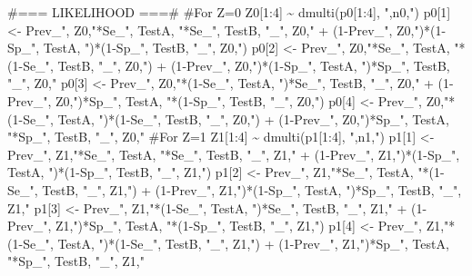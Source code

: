 \documentclass[
]{book}
\newenvironment{Shaded}{\begin{snugshade}}{\end{snugshade}}
\newcommand{\NormalTok}[1]{#1}
\newcommand{\StringTok}[1]{\textcolor[rgb]{0.31,0.60,0.02}{#1}}
\begin{document}
\begin{Shaded}
\begin{Highlighting}[]
\StringTok{\#=== LIKELIHOOD ===\#}
\StringTok{  \#For Z=0}
\StringTok{  Z0[1:4] \textasciitilde{} dmulti(p0[1:4], "}\NormalTok{,n0,}\StringTok{")}
\StringTok{  p0[1] \textless{}{-} Prev\_"}\NormalTok{, Z0,}\StringTok{"*Se\_"}\NormalTok{, TestA, }\StringTok{"*Se\_"}\NormalTok{, TestB, }\StringTok{"\_"}\NormalTok{, Z0,}\StringTok{" + (1{-}Prev\_"}\NormalTok{, Z0,}\StringTok{")*(1{-}Sp\_"}\NormalTok{, TestA, }\StringTok{")*(1{-}Sp\_"}\NormalTok{, TestB, }\StringTok{"\_"}\NormalTok{, Z0,}\StringTok{")}
\StringTok{  p0[2] \textless{}{-} Prev\_"}\NormalTok{, Z0,}\StringTok{"*Se\_"}\NormalTok{, TestA, }\StringTok{"*(1{-}Se\_"}\NormalTok{, TestB, }\StringTok{"\_"}\NormalTok{, Z0,}\StringTok{") + (1{-}Prev\_"}\NormalTok{, Z0,}\StringTok{")*(1{-}Sp\_"}\NormalTok{, TestA, }\StringTok{")*Sp\_"}\NormalTok{, TestB, }\StringTok{"\_"}\NormalTok{, Z0,}\StringTok{"}
\StringTok{  p0[3] \textless{}{-} Prev\_"}\NormalTok{, Z0,}\StringTok{"*(1{-}Se\_"}\NormalTok{, TestA, }\StringTok{")*Se\_"}\NormalTok{, TestB, }\StringTok{"\_"}\NormalTok{, Z0,}\StringTok{" + (1{-}Prev\_"}\NormalTok{, Z0,}\StringTok{")*Sp\_"}\NormalTok{, TestA, }\StringTok{"*(1{-}Sp\_"}\NormalTok{, TestB, }\StringTok{"\_"}\NormalTok{, Z0,}\StringTok{")}
\StringTok{  p0[4] \textless{}{-} Prev\_"}\NormalTok{, Z0,}\StringTok{"*(1{-}Se\_"}\NormalTok{, TestA, }\StringTok{")*(1{-}Se\_"}\NormalTok{, TestB, }\StringTok{"\_"}\NormalTok{, Z0,}\StringTok{") + (1{-}Prev\_"}\NormalTok{, Z0,}\StringTok{")*Sp\_"}\NormalTok{, TestA, }\StringTok{"*Sp\_"}\NormalTok{, TestB, }\StringTok{"\_"}\NormalTok{, Z0,}\StringTok{"}
\StringTok{  }
\StringTok{  \#For Z=1}
\StringTok{  Z1[1:4] \textasciitilde{} dmulti(p1[1:4], "}\NormalTok{,n1,}\StringTok{")}
\StringTok{  p1[1] \textless{}{-} Prev\_"}\NormalTok{, Z1,}\StringTok{"*Se\_"}\NormalTok{, TestA, }\StringTok{"*Se\_"}\NormalTok{, TestB, }\StringTok{"\_"}\NormalTok{, Z1,}\StringTok{" + (1{-}Prev\_"}\NormalTok{, Z1,}\StringTok{")*(1{-}Sp\_"}\NormalTok{, TestA, }\StringTok{")*(1{-}Sp\_"}\NormalTok{, TestB, }\StringTok{"\_"}\NormalTok{, Z1,}\StringTok{")}
\StringTok{  p1[2] \textless{}{-} Prev\_"}\NormalTok{, Z1,}\StringTok{"*Se\_"}\NormalTok{, TestA, }\StringTok{"*(1{-}Se\_"}\NormalTok{, TestB, }\StringTok{"\_"}\NormalTok{, Z1,}\StringTok{") + (1{-}Prev\_"}\NormalTok{, Z1,}\StringTok{")*(1{-}Sp\_"}\NormalTok{, TestA, }\StringTok{")*Sp\_"}\NormalTok{, TestB, }\StringTok{"\_"}\NormalTok{, Z1,}\StringTok{"}
\StringTok{  p1[3] \textless{}{-} Prev\_"}\NormalTok{, Z1,}\StringTok{"*(1{-}Se\_"}\NormalTok{, TestA, }\StringTok{")*Se\_"}\NormalTok{, TestB, }\StringTok{"\_"}\NormalTok{, Z1,}\StringTok{" + (1{-}Prev\_"}\NormalTok{, Z1,}\StringTok{")*Sp\_"}\NormalTok{, TestA, }\StringTok{"*(1{-}Sp\_"}\NormalTok{, TestB, }\StringTok{"\_"}\NormalTok{, Z1,}\StringTok{")}
\StringTok{  p1[4] \textless{}{-} Prev\_"}\NormalTok{, Z1,}\StringTok{"*(1{-}Se\_"}\NormalTok{, TestA, }\StringTok{")*(1{-}Se\_"}\NormalTok{, TestB, }\StringTok{"\_"}\NormalTok{, Z1,}\StringTok{") + (1{-}Prev\_"}\NormalTok{, Z1,}\StringTok{")*Sp\_"}\NormalTok{, TestA, }\StringTok{"*Sp\_"}\NormalTok{, TestB, }\StringTok{"\_"}\NormalTok{, Z1,}\StringTok{"}
\StringTok{   }


\end{Highlighting}
\end{Shaded}
\end{document}
